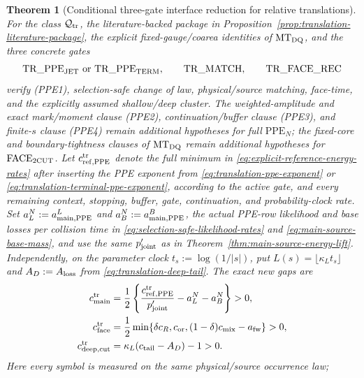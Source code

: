 \documentclass[11pt]{article}
\newtheorem{theorem}{Theorem}[section]
\begin{document}
\begin{theorem}[Conditional three-gate interface reduction for relative translations]
\label{thm:translation-three-gate-reduction}
For the class $\mathcal Q_{\rm tr}$, the literature-backed package in
Proposition~\ref{prop:translation-literature-package}, the explicit
fixed-gauge/coarea identities of $\mathrm{MT}_{\rm DQ}$, and the three
concrete gates
\[
 \mathrm{TR\_PPE}_{\rm JET}\ \text{or}\
 \mathrm{TR\_PPE}_{\rm TERM},\qquad
 \mathrm{TR\_MATCH},\qquad
 \mathrm{TR\_FACE\_REC}
\]
verify \textup{(PPE1)}, selection-safe change of law, physical/source
matching, face-time, and the explicitly assumed shallow/deep cluster.  The
weighted-amplitude and exact mark/moment clause \textup{(PPE2)}, continuation/buffer clause
\textup{(PPE3)}, and finite-$s$ clause \textup{(PPE4)} remain additional
hypotheses for full $\mathrm{PPE}_N$; the fixed-core and boundary-tightness
clauses of $\mathrm{MT}_{\rm DQ}$ remain additional hypotheses for
$\mathrm{FACE}_{\rm 2CUT}$.  Let
$c_{{\rm ref},{\rm PPE}}^{\rm tr}$ denote the \emph{full}
minimum in \eqref{eq:explicit-reference-energy-rates} after inserting the
PPE exponent from \eqref{eq:translation-ppe-exponent} or
\eqref{eq:translation-terminal-ppe-exponent}, according to the active gate,
and every remaining
context, stopping, buffer, gate, continuation, and probability-clock rate.
Set
$a_L^N:=a_{{\rm main},{\rm PPE}}^L$ and
$a_B^N:=a_{{\rm main},{\rm PPE}}^B$, the actual PPE-row likelihood and
base losses per collision time in
\eqref{eq:selection-safe-likelihood-rates} and
\eqref{eq:main-source-base-mass}, and use the same $p_{\rm joint}'$ as in
Theorem~\ref{thm:main-source-energy-lift}.  Independently, on the parameter
clock $t_s:=\log(1/|s|)$, put
$L(s)=\lfloor\kappa_Lt_s\rfloor$ and
$A_D:=A_{\rm loss}$ from \eqref{eq:translation-deep-tail}.  The exact new
gaps are
\begin{equation}
\label{eq:translation-three-new-margins}
\begin{split}
 c_{\rm main}^{\rm tr}
 &=\frac12\left\{\frac{c_{{\rm ref},{\rm PPE}}^{\rm tr}}
                         {p_{\rm joint}'}
                  -a_L^N-a_B^N\right\}>0,\\
 c_{\rm face}^{\rm tr}
 &=\frac12\min\{\delta c_R,c_{\rm or},
                  (1-\delta)c_{\rm mix}-a_{\rm fw}\}>0,\\
 c_{\rm deep,cut}^{\rm tr}
 &=\kappa_L(c_{\rm tail}-A_D)-1>0.
\end{split}
\end{equation}
Here every symbol is measured on the same physical/source occurrence law;

\end{theorem}
\end{document}
